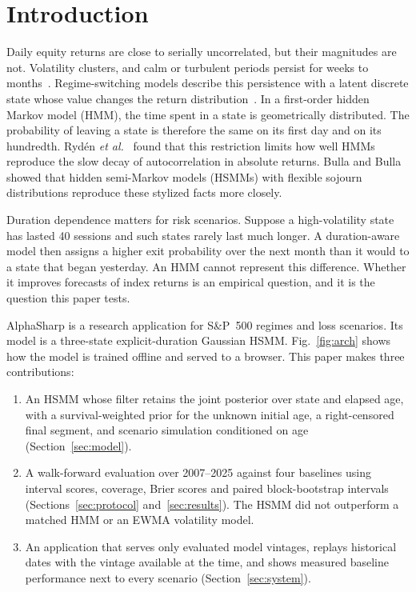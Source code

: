 \documentclass[conference]{IEEEtran}
\begin{document}
\section{Introduction}
Daily equity returns are close to serially uncorrelated, but their magnitudes are not. Volatility clusters, and calm or turbulent periods persist for weeks to months~\cite{engle1982,bollerslev1986}. Regime-switching models describe this persistence with a latent discrete state whose value changes the return distribution~\cite{hamilton1989,ang2012}. In a first-order hidden Markov model (HMM), the time spent in a state is geometrically distributed. The probability of leaving a state is therefore the same on its first day and on its hundredth. Ryd\'en \emph{et al.}~\cite{ryden1998} found that this restriction limits how well HMMs reproduce the slow decay of autocorrelation in absolute returns. Bulla and Bulla~\cite{bulla2006} showed that hidden semi-Markov models (HSMMs) with flexible sojourn distributions reproduce these stylized facts more closely.

Duration dependence matters for risk scenarios. Suppose a high-volatility state has lasted 40 sessions and such states rarely last much longer. A duration-aware model then assigns a higher exit probability over the next month than it would to a state that began yesterday. An HMM cannot represent this difference. Whether it improves forecasts of index returns is an empirical question, and it is the question this paper tests.

AlphaSharp is a research application for S\&P~500 regimes and loss scenarios. Its model is a three-state explicit-duration Gaussian HSMM. Fig.~\ref{fig:arch} shows how the model is trained offline and served to a browser. This paper makes three contributions:
\begin{enumerate}
\item An HSMM whose filter retains the joint posterior over state and elapsed age, with a survival-weighted prior for the unknown initial age, a right-censored final segment, and scenario simulation conditioned on age (Section~\ref{sec:model}).
\item A walk-forward evaluation over 2007--2025 against four baselines using interval scores, coverage, Brier scores and paired block-bootstrap intervals (Sections~\ref{sec:protocol} and~\ref{sec:results}). The HSMM did not outperform a matched HMM or an EWMA volatility model.
\item An application that serves only evaluated model vintages, replays historical dates with the vintage available at the time, and shows measured baseline performance next to every scenario (Section~\ref{sec:system}).
\end{enumerate}
\end{document}
